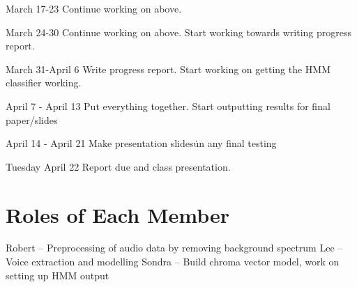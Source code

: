 \documentclass{article}
\begin{document}
March 17-23\newline
Continue working on above.\newline
\newline

March 24-30\newline
Continue working on above. Start working towards writing progress report.\newline
\newline

March 31-April 6\newline
Write progress report. Start working on getting the HMM classifier working.\newline
\newline

April 7 - April 13\newline
Put everything together. Start outputting results for final paper/slides\newline
\newline

April 14 - April 21\newline
Make presentation slides\. un any final testing\newline
\newline

Tuesday April 22\newline
Report due and class presentation.\newline
\newline

\section{Roles of Each Member}

Robert -- Preprocessing of audio data by removing background spectrum \newline
Lee -- Voice extraction and modelling\newline
Sondra -- Build chroma vector model, work on setting up HMM output\newline
\end{document}
